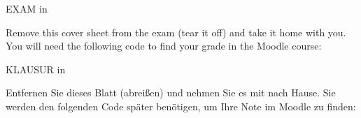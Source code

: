 \documentclass[a4paper]{minimal}
\begin{document}
\vspace*{6cm}
\begin{center}
{
 \fontsize{0.5cm}{0.7cm}\selectfont
 EXAM in \veranstaltung

 \vspace*{3mm}
 \semester

 \vspace*{1cm}

 \fontsize{0.5cm}{0.7cm}\selectfont
 Remove this cover sheet from the exam (tear it off)
 and take it home with you.
 You will need the following code
 to find your grade in the Moodle course:

 \vspace*{1cm}
 \fontsize{0.8cm}{1cm}\selectfont
 \fbox{\textbf{\randomexamnumber}}
 \vspace*{1cm}

 \fontsize{0.5cm}{0.7cm}\selectfont
}
{
 \fontsize{0.5cm}{0.7cm}\selectfont
 KLAUSUR in \veranstaltung

 \vspace*{3mm}
 \semester

 \vspace*{1cm}

 Entfernen Sie dieses Blatt (abreißen)
 und nehmen Sie es mit nach Hause.
 Sie werden den folgenden Code später benötigen,
 um Ihre Note im Moodle zu finden:

 \vspace*{1cm}
 \fontsize{0.8cm}{1cm}\selectfont
 \fbox{\textbf{\randomexamnumber}}
 \vspace*{1cm}

 \fontsize{0.5cm}{0.7cm}\selectfont
}
\end{center}
\clearpage
~
\end{document}
